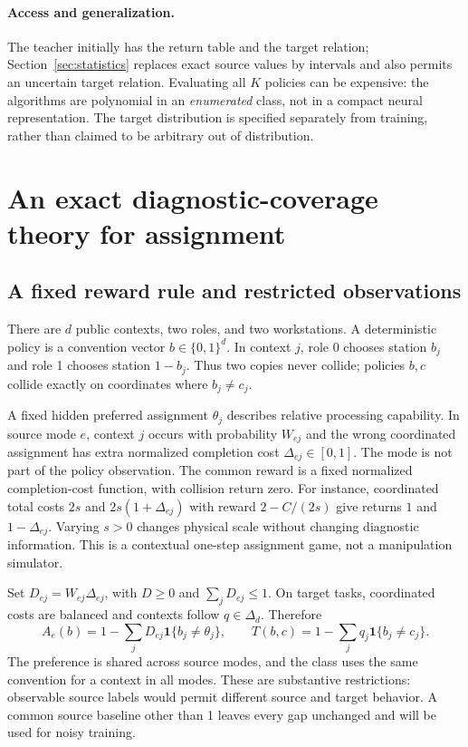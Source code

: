 \documentclass[11pt]{article}
\theoremstyle{definition}\newtheorem{definition}[theorem]{Definition}
\newcommand{\1}{\mathbf{1}}
\begin{document}
\paragraph{Access and generalization.}
The teacher initially has the return table and the target relation; Section~\ref{sec:statistics} replaces exact source values by intervals and also permits an uncertain target relation. Evaluating all $K$ policies can be expensive: the algorithms are polynomial in an \emph{enumerated} class, not in a compact neural representation. The target distribution is specified separately from training, rather than claimed to be arbitrary out of distribution.

\section{An exact diagnostic-coverage theory for assignment}
\label{sec:assignment}
\subsection{A fixed reward rule and restricted observations}
There are $d$ public contexts, two roles, and two workstations. A deterministic policy is a convention vector $b\in\{0,1\}^d$. In context $j$, role 0 chooses station $b_j$ and role 1 chooses station $1-b_j$. Thus two copies never collide; policies $b,c$ collide exactly on coordinates where $b_j\ne c_j$.

A fixed hidden preferred assignment $\theta_j$ describes relative processing capability. In source mode $e$, context $j$ occurs with probability $W_{ej}$ and the wrong coordinated assignment has extra normalized completion cost $\Delta_{ej}\in[0,1]$. The mode is not part of the policy observation. The common reward is a fixed normalized completion-cost function, with collision return zero. For instance, coordinated total costs $2s$ and $2s(1+\Delta_{ej})$ with reward $2-C/(2s)$ give returns $1$ and $1-\Delta_{ej}$. Varying $s>0$ changes physical scale without changing diagnostic information. This is a contextual one-step assignment game, not a manipulation simulator.

Set $D_{ej}=W_{ej}\Delta_{ej}$, with $D\geq0$ and $\sum_jD_{ej}\leq1$. On target tasks, coordinated costs are balanced and contexts follow $q\in\Delta_d$. Therefore
\begin{equation}
 A_e(b)=1-\sum_jD_{ej}\1\{b_j\ne\theta_j\},\qquad
 T(b,c)=1-\sum_jq_j\1\{b_j\ne c_j\}.
 \label{eq:assignment}
\end{equation}
The preference is shared across source modes, and the class uses the same convention for a context in all modes. These are substantive restrictions: observable source labels would permit different source and target behavior. A common source baseline other than 1 leaves every gap unchanged and will be used for noisy training.
\end{document}
